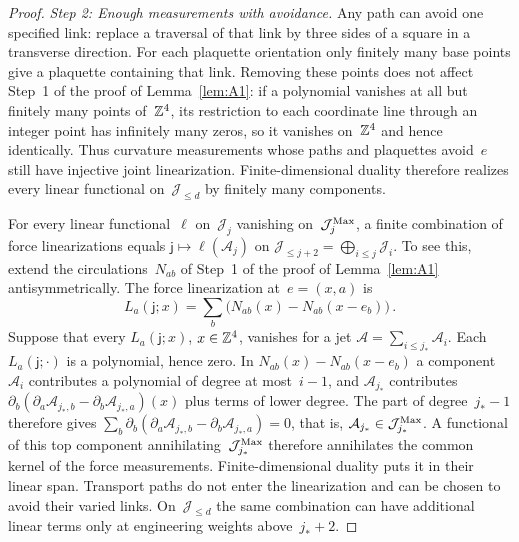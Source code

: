 \begin{proof}
\emph{Step 2: Enough measurements with avoidance.} Any path can avoid one specified link: replace a traversal of that link by three sides of a square in a transverse direction. For each plaquette orientation only finitely many base points give a plaquette containing that link. Removing these points does not affect Step~1 of the proof of Lemma~\ref{lem:A1}: if a polynomial vanishes at all but finitely many points of~$\mathbb{Z}^4$, its restriction to each coordinate line through an integer point has infinitely many zeros, so it vanishes on~$\mathbb{Z}^4$ and hence identically. Thus curvature measurements whose paths and plaquettes avoid~$e$ still have injective joint linearization. Finite-dimensional duality therefore realizes every linear functional on~$\mathcal J_{\le d}$ by finitely many components.

For every linear functional~$\ell$ on~$\mathcal J_j$ vanishing on~$\mathcal J_j^{\rm Max}$, a finite combination of force linearizations equals $\mathsf j\mapsto\ell(\mathcal A_j)$ on $\mathcal J_{\le j+2}=\bigoplus_{i\le j}\mathcal J_i$. To see this, extend the circulations~$N_{ab}$ of Step~1 of the proof of Lemma~\ref{lem:A1} antisymmetrically. The force linearization at~$e=(x,a)$ is
\begin{equation*}
L_a(\mathsf j;x)=\sum_b\bigl(N_{ab}(x)-N_{ab}(x-e_b)\bigr)\,.
\end{equation*}
Suppose that every $L_a(\mathsf j;x)$, $x\in\mathbb{Z}^4$, vanishes for a jet $\mathcal A=\sum_{i\le j_*}\mathcal A_i$. Each $L_a(\mathsf j;\cdot)$ is a polynomial, hence zero. In $N_{ab}(x)-N_{ab}(x-e_b)$ a component~$\mathcal A_i$ contributes a polynomial of degree at most~$i-1$, and $\mathcal A_{j_*}$ contributes $\partial_b(\partial_a\mathcal A_{j_*,b}-\partial_b\mathcal A_{j_*,a})(x)$ plus terms of lower degree. The part of degree~$j_*-1$ therefore gives $\sum_b\partial_b(\partial_a\mathcal A_{j_*,b}-\partial_b\mathcal A_{j_*,a})=0$, that is, $\mathcal A_{j_*}\in\mathcal J_{j_*}^{\rm Max}$. A functional of this top component annihilating~$\mathcal J_{j_*}^{\rm Max}$ therefore annihilates the common kernel of the force measurements. Finite-dimensional duality puts it in their linear span. Transport paths do not enter the linearization and can be chosen to avoid their varied links. On~$\mathcal J_{\le d}$ the same combination can have additional linear terms only at engineering weights above~$j_*+2$.


\end{proof}
